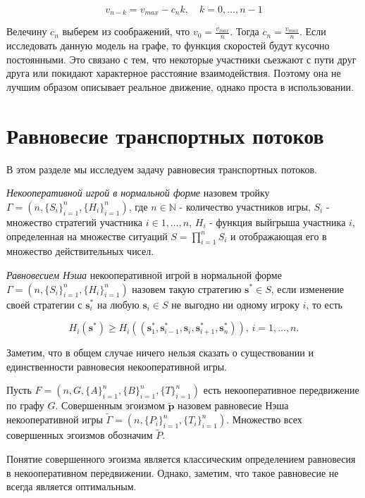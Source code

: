 \documentclass[12pt, a4paper]{article}
\begin{document}
$$v_{n - k} = v_{max} - c_n k, \quad k = 0, \dots, n - 1$$

Велечину $c_n$ выберем из соображений, что $v_0 = \frac{v_{max}}{n}$. Тогда $c_n = \frac{v_{max}}{n}$. Если исследовать данную модель на графе, то функция скоростей будут кусочно постоянными. Это связано с тем, что некоторые участники сьезжают с пути друг друга или покидают характерное расстояние взаимодействия. Поэтому она не лучшим образом описывает реальное движение, однако проста в использовании.

\section{Равновесие транспортных потоков}
В этом разделе мы исследуем задачу равновесия транспортных потоков.

\textit{Некооперативной игрой в нормальной форме} назовем тройку $\Gamma = (n, \{S_i\}_{i = 1}^n, \{H_i\}_{i = 1}^n)$, где $n \in \mathbb{N}$ - количество участников игры, $S_i$ - множество стратегий участника $i \in {1, \dots, n}$, $H_i$ - функция выйгрыша участника $i$, определенная на множестве ситуаций $S = \prod\limits_{i = 1}^n S_i$ и отображающая его в множество действительных чисел.

\textit{Равновесием Нэша} некооперативной игрой в нормальной форме $\Gamma = (n, \{S_i\}_{i = 1}^n, \{H_i\}_{i = 1}^n)$ назовем такую стратегию $\textbf{s}^* \in S$, если изменение своей стратегии с $\textbf{s}_i^*$ на любую $\textbf{s}_i \in S$ не выгодно ни одному игроку $i$, то есть

$$H_i(\textbf{s}^*) \ge H_i(\left(\textbf{s}^*_1, \textbf{s}^*_{i - 1}, \textbf{s}_i, \textbf{s}^*_{i + 1}, \textbf{s}^*_{n} \right)), \, i = 1, \dots, n. $$ 

Заметим, что в общем случае ничего нельзя сказать о существовании и единственности равновесия некооперативной игры.

Пусть $F = (n, G, \{A\}_{i = 1}^{n}, \{B\}_{i = 1}^{n}, \{T\}_{i = 1}^{n})$ есть некооперативное передвижение по графу $G$. Совершенным эгоизмом $\widetilde{\textbf{p}}$ назовем равновесие Нэша некооперативной игры $\widetilde{\Gamma} = (n, \{P_i\}_{i = 1}^n, \{T_i\}_{i = 1}^n)$. Множество всех совершенных эгоизмов обозначим $\widetilde{P}$.

Понятие совершенного эгоизма является классическим определением равновесия в некооперативном передвижении. Однако, заметим, что такое равновесие не всегда является оптимальным.
\end{document}
